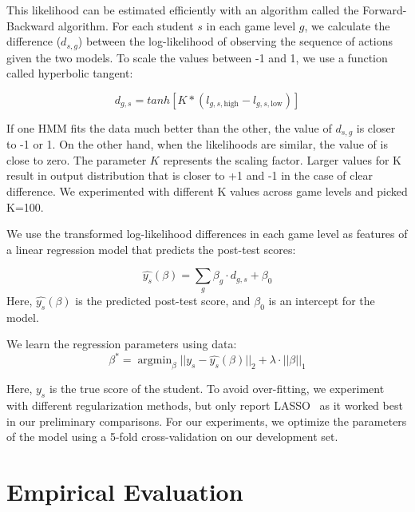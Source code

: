 \documentclass{sigchi}
\DeclareMathOperator*{\argmin}{argmin}
\begin{document}
	This likelihood can be estimated efficiently with an algorithm called the Forward-Backward algorithm. 
	For each student $s$ in each game level $g$, we calculate the difference ($d_{s,g}$) between the log-likelihood of observing the sequence of actions given the two models. 
	To scale the values between -1 and 1, we use a function called hyperbolic tangent: 
	
	\begin{equation}
	d_{g,s} = tanh[ K * (l_{g, s, \text{high}} - l_{g, s, \text{low}})]
	\end{equation}
	
 	If one HMM fits the data much better than the other, the value of $d_{s,g}$ is closer to -1 or 1.
	On the other hand, when the likelihoods are similar,  the value of is close to zero. 
	The parameter $K$ represents the scaling factor.
	Larger values for K result in output distribution that is closer to +1 and -1 in the case of clear difference.
	We experimented with different K values across game levels and picked K=100.

	We use the transformed log-likelihood differences in each game level as features of a linear regression model that predicts the post-test scores:

	\begin{equation}
	\hat {y_s}(\beta) =   \sum_g \beta_g \cdot d_{g,s}  + \beta_0
	\end{equation}
	Here, $\hat {y_s}(\beta)$ is the predicted post-test score, and $\beta_0$ is an intercept for the  model.  
	
	We learn the regression parameters using data:
	\begin{equation}
	\beta^* = \argmin_\beta || y_s - \hat{y_s}(\beta)  ||_2 + \lambda \cdot || \beta ||_1
	\end{equation}
	
	Here, $y_s$ is the true score of the student.
	To avoid over-fitting, we experiment with different regularization methods, but only report LASSO~\cite{tibshirani1996regression} as it worked best in our preliminary comparisons.
	For our experiments, we optimize the parameters of the model using a 5-fold cross-validation on our development set.

	
	\section{Empirical Evaluation}
	\label{sec:experiments}
	
\end{document}
